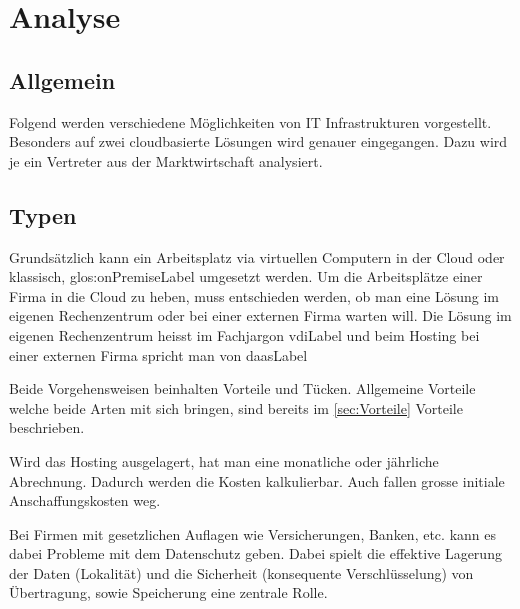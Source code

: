 

\chapter{Analyse}
\label{sec:analyse}

\section{Allgemein}

Folgend werden verschiedene Möglichkeiten von IT Infrastrukturen vorgestellt.
Besonders auf zwei cloudbasierte Lösungen wird genauer eingegangen. Dazu wird je ein Vertreter aus der Marktwirtschaft analysiert.

\section{Typen}
Grundsätzlich kann ein Arbeitsplatz via virtuellen Computern in der Cloud oder klassisch, \gls{glos:onPremiseLabel} umgesetzt werden.
Um die Arbeitsplätze einer Firma in die Cloud zu heben, muss entschieden werden, ob man eine Lösung im eigenen Rechenzentrum oder bei einer externen Firma warten will.
Die Lösung im eigenen Rechenzentrum heisst im Fachjargon \Gls{vdiLabel} und beim Hosting bei einer externen Firma spricht man von \Gls{daasLabel}

Beide Vorgehensweisen beinhalten Vorteile und Tücken. Allgemeine Vorteile welche beide Arten mit sich bringen, sind bereits im \cref{sec:Vorteile} Vorteile beschrieben.

Wird das Hosting ausgelagert, hat man eine monatliche oder jährliche Abrechnung. Dadurch werden die Kosten kalkulierbar. Auch fallen grosse initiale Anschaffungskosten weg.

Bei Firmen mit gesetzlichen Auflagen wie Versicherungen, Banken, etc. kann es dabei Probleme mit dem Datenschutz geben.
Dabei spielt die effektive Lagerung der Daten (Lokalität) und die Sicherheit (konsequente Verschlüsselung) von Übertragung, sowie Speicherung eine zentrale Rolle.

